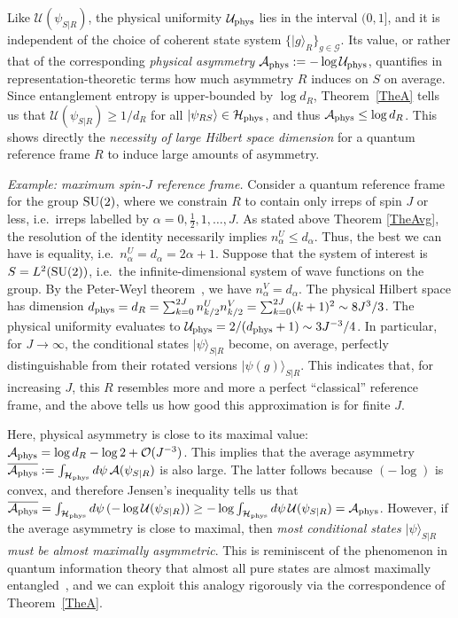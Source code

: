 \documentclass[aps,10pt,twocolumn,showpacs,pra,citeautoscript,amsmath,amssymb,floatfix,superscriptaddress]{revtex4-1}
\begin{document}
Like $\mathcal{U}(\psi_{S|R})$, the physical uniformity $\mathcal{U}_{\rm phys}$ lies in the interval $(0,1]$, and it is independent of the choice of coherent state system $\{|g\rangle_R\}_{g\in\mathcal{G}}$. Its value, or rather that of the corresponding \emph{physical asymmetry} $\mathcal{A}_{\rm phys}:=-\log \mathcal{U}_{\rm phys}$, quantifies in representation-theoretic terms how much asymmetry $R$ induces on $S$ on average. Since entanglement entropy is upper-bounded by $\log d_R$, Theorem~\ref{TheA} tells us that $\mathcal{U}(\psi_{S|R})\geq 1/d_R$ for all $|\psi_{RS}\rangle\in\mathcal{H}_{\rm phys}$, and thus $\mathcal{A}_{\rm phys}\leq \log d_R$. This shows directly the \emph{necessity of large Hilbert space dimension} for a quantum reference frame $R$ to induce large amounts of asymmetry.

\emph{Example: maximum spin-$J$ reference frame.} Consider a quantum reference frame for the group ${\rm SU}(2)$, where we constrain $R$ to contain only irreps of spin $J$ or less, i.e.\ irreps labelled by $\alpha=0,\frac 1 2,1,\ldots,J$. As stated above Theorem \ref{TheAvg}, the resolution of the identity necessarily implies $n_\alpha^U\leq d_\alpha$. Thus, the best we can have is equality, i.e.\ $n_\alpha^U=d_\alpha=2\alpha+1$. Suppose that the system of interest is $S=L^2({\rm SU}(2))$, i.e.\ the infinite-dimensional system of wave functions on the group. By the Peter-Weyl theorem~\cite{Simon}, we have $n_\alpha^V=d_\alpha$. The physical Hilbert space has dimension $d_{\rm phys}=d_R=\sum_{k=0}^{2J} n_{k/2}^U n_{k/2}^V=\sum_{k=0}^{2J}(k+1)^2\sim 8  J^3/3$. The physical uniformity evaluates to $\mathcal{U}_{\rm phys}=2/(d_{\rm phys}+1)\sim 3 J^{-3}/4$. In particular, for $J\to\infty$, the conditional states $|\psi\rangle_{S|R}$ become, on average, perfectly distinguishable from their rotated versions $|\psi(g)\rangle_{S|R}$. This indicates that, for increasing $J$, this $R$ resembles more and more a perfect ``classical'' reference frame, and the above tells us how good this approximation is for finite $J$.

Here, physical asymmetry is close to its maximal value: $\mathcal{A}_{\rm phys}=\log d_R - \log 2 + \mathcal{O}(J^{-3})$. This implies that the average asymmetry $\overline{\mathcal{A}_{\rm phys}}:=\int_{\mathcal{H}_{\rm phys}}d\psi\, \mathcal{A}(\psi_{S|R})$ is also large. The latter follows because $(-\log)$ is convex, and therefore Jensen's inequality tells us that $\overline{\mathcal{A}_{\rm phys}}=\int_{\mathcal{H}_{\rm phys}}d\psi\,(-\log \mathcal{U}(\psi_{S|R}))\geq -\log \int_{\mathcal{H}_{\rm phys}}d\psi\,\mathcal{U}(\psi_{S|R})=\mathcal{A}_{\rm phys}$. However, if the average asymmetry is close to maximal, then \emph{most conditional states $|\psi\rangle_{S|R}$ must be almost maximally asymmetric}. This is reminiscent of the phenomenon in quantum information theory that almost all pure states are almost maximally entangled~\cite{HaydenLeungWinter}, and we can exploit this analogy rigorously via the correspondence of Theorem~\ref{TheA}.
\end{document}

